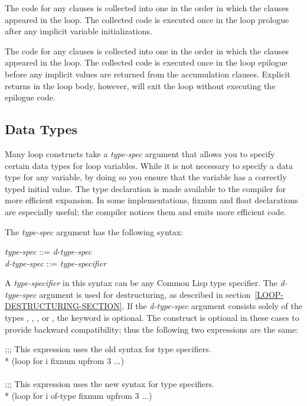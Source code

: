   The code for any  clauses is collected
  into one  in the order in which the clauses appeared in
  the loop.  The collected code is executed once in the loop prologue
  after any implicit variable initializations.

  The code for any  clauses is collected 
  into one  in the order in which the clauses appeared in
  the loop.  The collected code is executed once in the loop epilogue
  before any implicit values are returned from the accumulation clauses.
  Explicit returns in the loop body, however, will exit the loop
  without executing the epilogue code.

\subsection{Data Types}
\label{LOOP-TYPES-SECTION}

Many loop constructs take a {\it type-spec\/} argument that
allows you to specify  certain data types for loop variables.
While it is not necessary to specify a data type for any variable,
by doing so you ensure that the variable has a correctly typed initial
value.  The type declaration is made available to the compiler for
more efficient  
expansion. 
In some implementations,
fixnum and float declarations are especially
useful; the compiler notices them and emits more efficient code.  



The {\it type-spec\/} argument has the following syntax:
\begin{tabbing}
{\it type-spec\/} ::=  {\it d-type-spec} \\
{\it d-type-spec\/} ::= {\it type-specifier\/} {\Mor} 
\end{tabbing}
A {\it type-specifier} in this syntax can be any Common Lisp type
specifier.  The {\it d-type-spec} argument is used for destructuring,
as described in section~\ref{LOOP-DESTRUCTURING-SECTION}.  If the
{\it d-type-spec} argument consists solely of the types ,
, , or \nil, the  keyword is optional.  The
 construct is optional in these cases to provide backward
compatibility; thus the following two expressions are the same:

\begin{lisp}
;;; This expression uses the old syntax for type specifiers. \\*
(loop for i fixnum upfrom 3 ...) \\
 \\
;;; This expression uses the new syntax for type specifiers. \\*
(loop for i of-type fixnum upfrom 3 ...)
\end{lisp}


